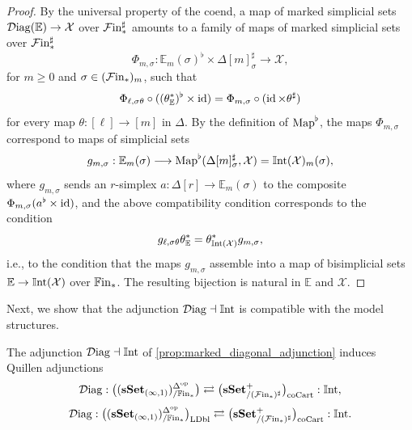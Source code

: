 \documentclass[10pt,reqno]{amsart}
\begin{document}
\begin{proof}
By the universal property of the coend, a map of marked simplicial
sets $\mathcal{D}\mathrm{iag}(\mathbb E)\to \mathcal X$ over $\mathcal{F}\mathrm{in}_*^\sharp$ amounts
to a family of maps of marked simplicial sets over $\mathcal{F}\mathrm{in}_*^\sharp$
\[
 \Phi_{m,\sigma}:\mathbb E_m(\sigma)^\flat
 \times\Delta[m]^\sharp_\sigma\longrightarrow \mathcal X,
\]
for $m\geq0$ and $\sigma\in(\mathcal{F}\mathrm{in}_*)_m$, such that
\[
 \Phi_{\ell,\sigma\theta}\circ((\theta_{\mathbb E}^*)^\flat\times\operatorname{id})
 =\Phi_{m,\sigma}\circ(\operatorname{id}\times\theta^\sharp)
\]
for every map $\theta:[\ell]\to[m]$ in $\Delta$. By the definition
of $\operatorname{Map}^\flat$, the maps $\Phi_{m,\sigma}$ correspond to maps of
simplicial sets
\[
 g_{m,\sigma}:\mathbb E_m(\sigma)\longrightarrow
 \operatorname{Map}^\flat(\Delta[m]^\sharp_\sigma,\mathcal X)
 =\mathbb{I}\mathrm{nt}(\mathcal X)_m(\sigma),
\]
where $g_{m,\sigma}$ sends an $r$-simplex
$a:\Delta[r]\to\mathbb E_m(\sigma)$ to the composite
$\Phi_{m,\sigma}(a^\flat\times\operatorname{id})$, and the above compatibility
condition corresponds to the condition
\[
 g_{\ell,\sigma\theta}\theta_{\mathbb E}^*
 =\theta_{\mathbb{I}\mathrm{nt}(\mathcal X)}^*g_{m,\sigma},
\]
i.e., to the condition that the maps $g_{m,\sigma}$ assemble into a
map of bisimplicial sets $\mathbb E\to\mathbb{I}\mathrm{nt}(\mathcal X)$ over
$\mathbb{F}\mathrm{in}_*$. The resulting bijection is natural in $\mathbb E$ and
$\mathcal X$.
\end{proof}

Next, we show that the adjunction $\mathcal{D}\mathrm{iag}\dashv\mathbb{I}\mathrm{nt}$ is compatible
with the model structures.

\begin{proposition}
\label{prop:marked_diagonal_quillen_pair}
The adjunction $\mathcal{D}\mathrm{iag}\dashv\mathbb{I}\mathrm{nt}$ of
\cref{prop:marked_diagonal_adjunction} induces Quillen adjunctions
\[
\begin{gathered}
 \mathcal{D}\mathrm{iag}:\bigl((\mathbf{sSet}_{(\infty,1)})^{\Delta^{\mathrm{op}}}_{/\mathbb{F}\mathrm{in}_*}\bigr)\rightleftarrows\bigl(\mathbf{sSet}^+_{/(\mathcal{F}\mathrm{in}_*)^\sharp}\bigr)_{\mathrm{coCart}}:\mathbb{I}\mathrm{nt},\\[3pt]
 \mathcal{D}\mathrm{iag}:\bigl((\mathbf{sSet}_{(\infty,1)})^{\Delta^{\mathrm{op}}}_{/\mathbb{F}\mathrm{in}_*}\bigr)_{\mathrm{LDbl}}\rightleftarrows\bigl(\mathbf{sSet}^+_{/(\mathcal{F}\mathrm{in}_*)^\sharp}\bigr)_{\mathrm{coCart}}:\mathbb{I}\mathrm{nt}.
\end{gathered}
\]
\end{proposition}
\end{document}
